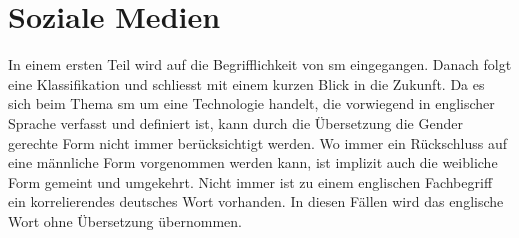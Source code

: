 %
%

\chapter{Soziale Medien}\label{chap.sm}
\glsresetall
In einem ersten Teil wird auf die Begrifflichkeit von \gls{sm} eingegangen. Danach folgt eine Klassifikation und schliesst mit einem kurzen Blick in die Zukunft.\newline
Da es sich beim Thema \gls{sm} um eine Technologie handelt, die vorwiegend in englischer Sprache verfasst und definiert ist, kann durch die Übersetzung die Gender gerechte Form nicht immer berücksichtigt werden. Wo immer ein Rückschluss auf eine männliche Form vorgenommen werden kann, ist implizit auch die weibliche Form gemeint und umgekehrt.  Nicht immer ist zu einem englischen Fachbegriff ein korrelierendes deutsches Wort vorhanden. In diesen Fällen wird das englische Wort ohne Übersetzung übernommen.
